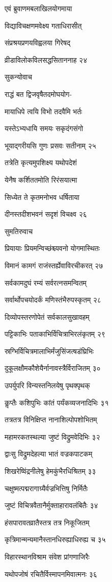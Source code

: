 एवं ब्रुवाणमबलाखिलयोगमाया

विद्याविचक्षणमवेक्ष्य गताधिरासीत्

संप्रश्रयप्रणयविह्वलया गिरेषद्

व्रीडाविलोकविलसद्धसिताननाह २४

सुकन्योवाच

राद्धं बत द्विजवृषैतदमोघयोग-

मायाधिपे त्वयि विभो तदवैमि भर्तः

यस्तेऽभ्यधायि समयः सकृदंगसंगो

भूयाद्गरीयसि गुणः प्रसवः सतीनाम् २५

तत्रेति कृत्यमुपशिक्ष्य यथोपदेशं

येनैष कर्शिततमोति रिरंसयात्मा

सिध्येत ते कृतमनोभव धर्षिताया

दीनस्तदीशभवनं सदृशं विचक्ष्व २६

सुमतिरुवाच

प्रियायाः प्रियमन्विच्छंश्च्यवनो योगमास्थितः

विमानं कामगं राजंस्तर्ह्येवाविरचीकरत् २७

सर्वकामदुघं रम्यं सर्वरत्नसमन्वितम्

सर्वार्थोपचयोदर्कं मणिस्तंभैरुपस्कृतम् २८

दिव्योपस्तरणोपेतं सर्वकालसुखावहम्

पट्टिकाभिः पताकाभिर्विचित्राभिरलंकृतम् २९

स्रग्भिर्विचित्रमालाभिर्मंजुसिंजत्षडंघ्रिभिः

दुकूलक्षौमकौशेयैर्नानावस्त्रैर्विराजितम् ३०

उपर्युपरि विन्यस्तनिलयेषु पृथक्पृथक्

कॢप्तैः कशिपुभिः कांतं पर्यंकव्यजनादिभिः ३१

तत्रतत्र विनिक्षिप्त नानाशिल्पोपशोभितम्

महामरकतस्थल्या जुष्टं विद्रुमवेदिभिः ३२

द्वाःसु विद्रुमदेहल्या भातं वज्रकपाटकम्

शिखरेष्विंद्रनीलेषु हेमकुंभैरधिश्रितम् ३३

चक्षुष्मत्पद्मरागाग्र्यैर्वज्रभित्तिषु निर्मितैः

जुष्टं विचित्रवैतानैर्मुक्ताहारावलंबितैः ३४

हंसपारावतव्रातैस्तत्र तत्र निकूजितम्

कृत्रिमान्मन्यमानैस्तानधिरुह्याधिरुह्य च ३५

विहारस्थानविश्राम संवेश प्रांगणाजिरैः

यथोपजोषं रचितैर्विस्मापनमिवात्मनः ३६

